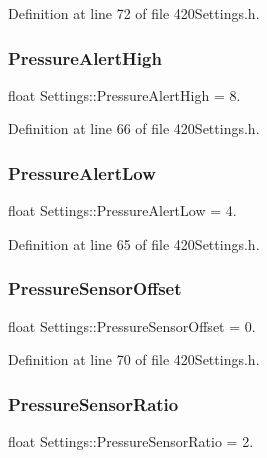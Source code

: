 Definition at line 72 of file 420\+Settings.\+h.

\mbox{\label{struct_settings_a8626ef35c32fefa3641eda2a0870e752}} 
\subsubsection{\texorpdfstring{PressureAlertHigh}{PressureAlertHigh}}
{\footnotesize\ttfamily float Settings\+::\+Pressure\+Alert\+High = 8.}



Definition at line 66 of file 420\+Settings.\+h.

\mbox{\label{struct_settings_a9e436ca0596493ca600e14aab8b2b229}} 
\subsubsection{\texorpdfstring{PressureAlertLow}{PressureAlertLow}}
{\footnotesize\ttfamily float Settings\+::\+Pressure\+Alert\+Low = 4.}



Definition at line 65 of file 420\+Settings.\+h.

\mbox{\label{struct_settings_acb268b606c3cf0917fb01044e051a112}} 
\subsubsection{\texorpdfstring{PressureSensorOffset}{PressureSensorOffset}}
{\footnotesize\ttfamily float Settings\+::\+Pressure\+Sensor\+Offset = 0.}



Definition at line 70 of file 420\+Settings.\+h.

\mbox{\label{struct_settings_af304b26ec1fe942717219db3fe959b4e}} 
\subsubsection{\texorpdfstring{PressureSensorRatio}{PressureSensorRatio}}
{\footnotesize\ttfamily float Settings\+::\+Pressure\+Sensor\+Ratio = 2.}



